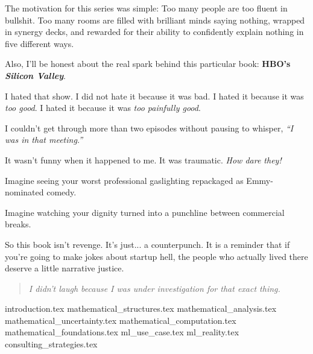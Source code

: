 \documentclass{article}
\begin{document}
  The motivation for this series was simple:
  Too many people are too fluent in bullshit.
  Too many rooms are filled with brilliant minds saying nothing, wrapped in synergy decks, and 
  rewarded for their ability to confidently explain nothing in five different ways.
  
  Also, I'll be honest about the real spark behind this particular book:
  \textbf{HBO’s \textit{Silicon Valley}}.
  
  I hated that show.
  I did not hate it because it was bad.
  I hated it because it was \textit{too good}.  
  I hated it because it was \textit{too painfully good}. 
  
  I couldn’t get through more than two episodes without pausing to whisper, 
  \textit{``I was in that meeting.''}
  
  It wasn’t funny when it happened to me.
  It was traumatic.
  \textit{How dare they!}
  
  Imagine seeing your worst professional gaslighting repackaged as Emmy-nominated comedy.
  
  Imagine watching your dignity turned into a punchline between commercial breaks.
  
  So this book isn’t revenge.
  It’s just... a counterpunch.
  It is a reminder that if you're going to make jokes about startup hell, the people who 
  actually lived there deserve a little narrative justice.
  
  \begin{quote}
  \textit{I didn’t laugh because I was under investigation for that exact thing.}\\[1ex]
  \noindent
  \begin{flushright}
  \end{flushright}
  \end{quote}
  
  
  


  \tableofcontents

  \newpage


  {introduction.tex}
  {mathematical_structures.tex}
  {mathematical_analysis.tex}
  {mathematical_uncertainty.tex}
  {mathematical_computation.tex}
  {mathematical_foundations.tex}
  {ml_use_case.tex}
  {ml_reality.tex}
  {consulting_strategies.tex}
\end{document}
